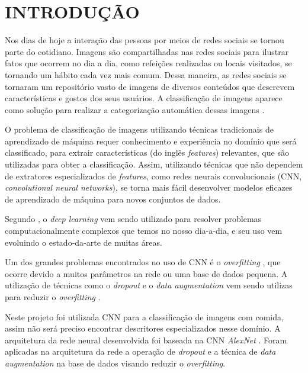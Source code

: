 
\chapter{INTRODUÇÃO}
\label{chap:introducao}
Nos dias de hoje a interação das pessoas por meios de redes sociais se tornou parte do cotidiano. 
Imagens são compartilhadas nas redes sociais para ilustrar fatos que ocorrem no dia a dia, como refeições realizadas ou locais visitados, se tornando um hábito cada vez mais comum. Dessa maneira, as redes sociais se tornaram um repositório vasto de imagens de diversos conteúdos que descrevem características e gostos dos seus usuários. A classificação de imagens aparece como solução para realizar a categorização automática dessas imagens \cite{imaginetArticle}.

\par O problema de classificação de imagens utilizando técnicas tradicionais de aprendizado de máquina requer conhecimento e experiência no domínio que será classificado, para extrair características (do inglês \textit{features}) relevantes, que são utilizadas para obter a classificação. Assim, utilizando técnicas que não dependem de extratores especializados de \textit{features}, como redes neurais convolucionais (CNN, \textit{convolutional neural networks}), se torna mais fácil desenvolver modelos eficazes de aprendizado de máquina para novos conjuntos de dados.

\par Segundo , o \textit{deep learning} vem sendo utilizado para resolver problemas computacionalmente complexos que temos no nosso dia-a-dia, e seu uso vem evoluindo o estado-da-arte de muitas áreas.

\par Um dos grandes problemas encontrados no uso de CNN é o \textit{overfitting} \cite{imaginetArticle}, que ocorre devido a muitos parâmetros na rede ou uma base de dados pequena. A utilização de técnicas como o \textit{dropout} e o \textit{data augmentation} vem sendo utilizas para reduzir o \textit{overfitting} \cite{srivastava2014dropout}.

\par Neste projeto foi utilizada CNN para a classificação de imagens com comida, assim não será preciso encontrar descritores especializados nesse domínio. A arquitetura da rede neural desenvolvida foi baseada na CNN \textit{AlexNet} . Foram aplicadas na arquitetura da rede a operação de \textit{dropout} e a técnica de \textit{data augmentation} na base de dados visando reduzir o \textit{overfitting}.


